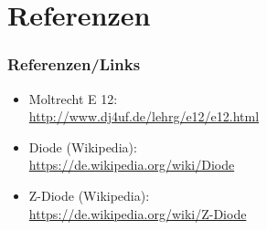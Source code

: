 \section*{Referenzen}

\begin{frame}
    \frametitle{Referenzen/Links}
    
    \footnotesize
    \begin{itemize}
        \item Moltrecht E 12: \\
              \url{http://www.dj4uf.de/lehrg/e12/e12.html}
        \item Diode (Wikipedia): \\
              \url{https://de.wikipedia.org/wiki/Diode}
        \item Z-Diode (Wikipedia): \\
              \url{https://de.wikipedia.org/wiki/Z-Diode}
    \end{itemize}

\end{frame}


